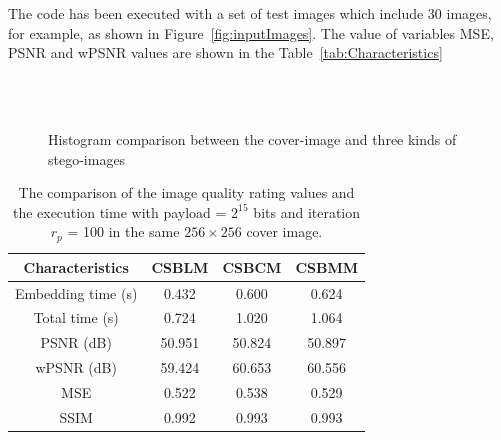 \documentclass[conference]{IEEEtran}
\begin{document}
\indent The code has been executed with a set of test images which include 30 images, for example, as shown in Figure~\ref{fig:inputImages}. The value of variables MSE, PSNR and wPSNR values are shown in the Table~\ref{tab:Characteristics}
\begin{figure}
\hfill
{}\\
\hfill
{}\\
\caption{Histogram comparison between the cover-image and three kinds of stego-images}
\label{fig:timecomparison}
\end{figure}

\begin{table}[htbp]
	\caption{The comparison of the image quality rating values and the execution time with payload = \(2^{15}\) bits and iteration \(r_{p}\) = 100 in the same \(256 \times 256\) cover image. }
	\centering
	\begin{tabular}{|c|c|c|c|}
		\hline
		\textbf{Characteristics}&\textbf{CSBLM}&\textbf{CSBCM}&\textbf{CSBMM}\\
		\cline{1-4}
		\hline
		Embedding time (s) & 0.432 & 0.600 & 0.624 \\
		Total time (s) & 0.724 & 1.020 & 1.064 \\
		PSNR (dB) & 50.951 & 50.824 & 50.897 \\
		wPSNR (dB) & 59.424 & 60.653 & 60.556 \\
		MSE & 0.522 & 0.538 & 0.529	\\
		SSIM & 0.992 & 0.993 & 0.993 \\
		\hline
	\end{tabular}
	\label{tab:256256Comparison}
\end{table}
\end{document}
